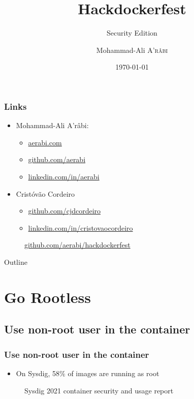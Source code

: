 \documentclass[10pt, compress]{beamer}
\title{Hackdockerfest}
\subtitle{Security Edition}
\date{\today}
\author{Mohammad-Ali \textsc{A'r\^abi}}
\institute{Docker Community}
\begin{document}
\maketitle

\begin{frame}[fragile]
  \frametitle{Links}
  
  \begin{itemize}
      \item Mohammad-Ali A'r\^abi:
      \begin{itemize}
          \item \url{aerabi.com}
          \item \url{github.com/aerabi}
          \item \url{linkedin.com/in/aerabi}
      \end{itemize}
      \item Crist\'ov\~ao Cordeiro
      \begin{itemize}
          \item \url{github.com/cjdcordeiro}
          \item \url{linkedin.com/in/cristovaocordeiro}
      \end{itemize}
  \end{itemize}
  
  \begin{figure}
      \centering
      \caption{\url{github.com/aerabi/hackdockerfest}}
  \end{figure}
\end{frame}

\begin{frame}{Outline}
    \tableofcontents
\end{frame}

\section{Go Rootless}

\subsection{Use non-root user in the container}

\begin{frame}[fragile]
  \frametitle{Use non-root user in the container}
  
  \begin{itemize}
      \item  On Sysdig, 58\% of images are running as root
  \end{itemize}
  
  \begin{figure}
      \centering
      \caption{Sysdig 2021 container security and usage report}
  \end{figure}
\end{frame}
\end{document}
